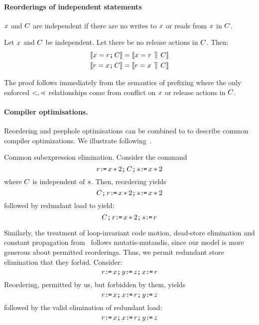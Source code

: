 \paragraph*{Reorderings of independent statements}

$x$ and $C$ are independent if there are no writes to $x$ or reads from $x$ in $C$.  
\begin{lemma}[Reorderings]
Let $x$ and $C$ be independent.  Let there be no release actions in $C$.  Then:
\begin{align*}
& \llbracket x = r \texttt{;}\, C\rrbracket = \llbracket x = r \,\mathbin{\rrceil}\, C\rrbracket \\
& \llbracket r = x \texttt{;}\, C\rrbracket = \llbracket r= x \,\mathbin{\rrceil}\, C\rrbracket 
\end{align*}
\end{lemma}
The proof follows immediately from the semantics of prefixing where the only enforced $\mathrel{{\color{blue}<}},\lessdot$ relationships come from conflict on $x$ or release actions in $C$.

\paragraph*{Compiler optimisations.} Reordering and peephole optimisations can be combined to  to describe common  compiler optimizations.  We illustrate following~\citet{Dolan:2018:BDR:3192366.3192421}.

Common subexpression elimination. Consider the command 
\[ r \texttt{:}\mkern-1mu\texttt{=}\, x *2  \texttt{;}\, C \texttt{;}\, s \texttt{:}\mkern-1mu\texttt{=}\, x * 2 \]
where $C$ is independent of $s$.  Then, reordering yields
\[C \texttt{;}\, r \texttt{:}\mkern-1mu\texttt{=}\, x *2  \texttt{;}\,  s \texttt{:}\mkern-1mu\texttt{=}\, x * 2 \]
followed by redundant load to yield:
\[C \texttt{;}\, r \texttt{:}\mkern-1mu\texttt{=}\, x * 2 \texttt{;}\,  s \texttt{:}\mkern-1mu\texttt{=}\, r\]

Similarly, the treatment of loop-invariant code motion, dead-store elimination and constant propagation from~\citet{Dolan:2018:BDR:3192366.3192421} follows mutatis-mutandis, since our model is more generous about permitted reorderings.  Thus, we permit  redundant store elimination that they forbid.
Consider:
\[ r \texttt{:}\mkern-1mu\texttt{=}\, x \texttt{;}\, y \texttt{:}\mkern-1mu\texttt{=}\, z  \texttt{;}\, x \texttt{:}\mkern-1mu\texttt{=}\, r \]
Reordering, permitted by us, but forbidden by them, yields
\[ r \texttt{:}\mkern-1mu\texttt{=}\, x \texttt{;}\, x \texttt{:}\mkern-1mu\texttt{=}\, r \texttt{;}\, y \texttt{:}\mkern-1mu\texttt{=}\, z  \]
followed by the valid elimination of redundant load:
\[ r \texttt{:}\mkern-1mu\texttt{=}\, x \texttt{;}\, x \texttt{:}\mkern-1mu\texttt{=}\, r \texttt{;}\, y \texttt{:}\mkern-1mu\texttt{=}\, z  \]

\endinput










